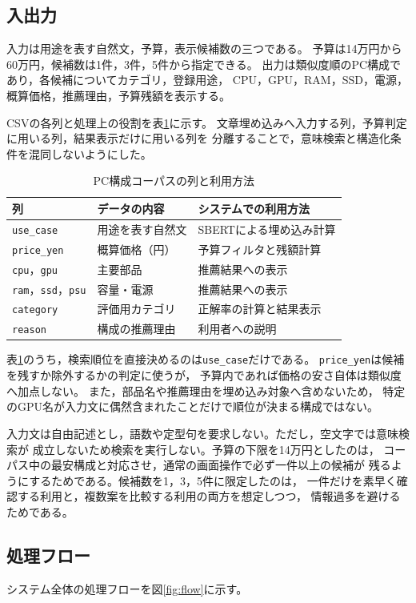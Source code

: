 \documentclass[a4paper,11pt]{article}
\begin{document}
\subsection{入出力}
入力は用途を表す自然文，予算，表示候補数の三つである。
予算は14万円から60万円，候補数は1件，3件，5件から指定できる。
出力は類似度順のPC構成であり，各候補についてカテゴリ，登録用途，
CPU，GPU，RAM，SSD，電源，概算価格，推薦理由，予算残額を表示する。

CSVの各列と処理上の役割を表\ref{tab:data-schema}に示す。
文章埋め込みへ入力する列，予算判定に用いる列，結果表示だけに用いる列を
分離することで，意味検索と構造化条件を混同しないようにした。

\begin{table}[htbp]
  \centering
  \caption{PC構成コーパスの列と利用方法}
  \label{tab:data-schema}
  \begin{tabular}{lll}
    \toprule
    列 & データの内容 & システムでの利用方法\\
    \midrule
    \verb|use_case| & 用途を表す自然文 & SBERTによる埋め込み計算\\
    \verb|price_yen| & 概算価格（円） & 予算フィルタと残額計算\\
    \verb|cpu|，\verb|gpu| & 主要部品 & 推薦結果への表示\\
    \verb|ram|，\verb|ssd|，\verb|psu| & 容量・電源 & 推薦結果への表示\\
    \verb|category| & 評価用カテゴリ & 正解率の計算と結果表示\\
    \verb|reason| & 構成の推薦理由 & 利用者への説明\\
    \bottomrule
  \end{tabular}
\end{table}

表\ref{tab:data-schema}のうち，検索順位を直接決めるのは\verb|use_case|だけである。
\verb|price_yen|は候補を残すか除外するかの判定に使うが，
予算内であれば価格の安さ自体は類似度へ加点しない。
また，部品名や推薦理由を埋め込み対象へ含めないため，
特定のGPU名が入力文に偶然含まれたことだけで順位が決まる構成ではない。

入力文は自由記述とし，語数や定型句を要求しない。ただし，空文字では意味検索が
成立しないため検索を実行しない。予算の下限を14万円としたのは，
コーパス中の最安構成と対応させ，通常の画面操作で必ず一件以上の候補が
残るようにするためである。候補数を1，3，5件に限定したのは，
一件だけを素早く確認する利用と，複数案を比較する利用の両方を想定しつつ，
情報過多を避けるためである。

\subsection{処理フロー}
システム全体の処理フローを図\ref{fig:flow}に示す。
\end{document}
